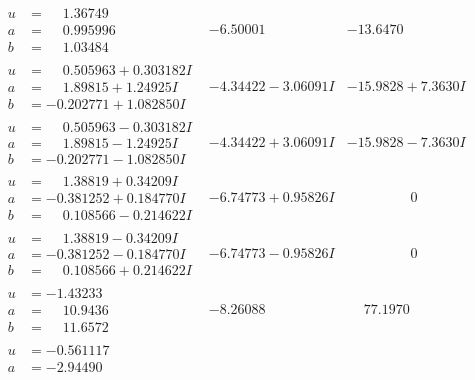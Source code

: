 \documentclass[1p]{elsarticle_modified}
\theoremstyle{definition}
\begin{document}
$$\begin{array}{c|c|c}
\begin{aligned}
u &= \phantom{-}1.36749\phantom{ +0.000000I} \\
a &= \phantom{-}0.995996\phantom{ +0.000000I} \\
b &= \phantom{-}1.03484\phantom{ +0.000000I}\end{aligned}
 & -6.50001\phantom{ +0.000000I} & -13.6470\phantom{ +0.000000I} \\ \hline\begin{aligned}
u &= \phantom{-}0.505963 + 0.303182 I \\
a &= \phantom{-}1.89815 + 1.24925 I \\
b &= -0.202771 + 1.082850 I\end{aligned}
 & -4.34422 - 3.06091 I & -15.9828 + 7.3630 I \\ \hline\begin{aligned}
u &= \phantom{-}0.505963 - 0.303182 I \\
a &= \phantom{-}1.89815 - 1.24925 I \\
b &= -0.202771 - 1.082850 I\end{aligned}
 & -4.34422 + 3.06091 I & -15.9828 - 7.3630 I \\ \hline\begin{aligned}
u &= \phantom{-}1.38819 + 0.34209 I \\
a &= -0.381252 + 0.184770 I \\
b &= \phantom{-}0.108566 - 0.214622 I\end{aligned}
 & -6.74773 + 0.95826 I & \phantom{-0.000000 } 0 \\ \hline\begin{aligned}
u &= \phantom{-}1.38819 - 0.34209 I \\
a &= -0.381252 - 0.184770 I \\
b &= \phantom{-}0.108566 + 0.214622 I\end{aligned}
 & -6.74773 - 0.95826 I & \phantom{-0.000000 } 0 \\ \hline\begin{aligned}
u &= -1.43233\phantom{ +0.000000I} \\
a &= \phantom{-}10.9436\phantom{ +0.000000I} \\
b &= \phantom{-}11.6572\phantom{ +0.000000I}\end{aligned}
 & -8.26088\phantom{ +0.000000I} & \phantom{-}77.1970\phantom{ +0.000000I} \\ \hline\begin{aligned}
u &= -0.561117\phantom{ +0.000000I} \\
a &= -2.94490\phantom{ +0.000000I} \\

\end{aligned}
\end{array}$$
\end{document}
